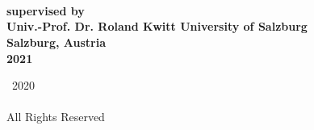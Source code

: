 

\thispagestyle{empty}

\begingroup
\centering
{}
~
\\[1em]
\sffamily\bfseries\fontsize{26}{31.2}\selectfont
\DocumentTitle
\\[0.4in]
\normalfont\large
\Large{\AuthorName}
\vspace{1cm}\\
\normalsize{supervised by}\\
\Large{Univ.-Prof. Dr. Roland Kwitt}
\vfill
University of Salzburg
\\[0.5em]
Salzburg, Austria
\\[1.5em]
2021
\par
\endgroup

\clearpage


\pagestyle{plain}
\setcounter{page}{2}

\begingroup
\centering
{}
\null
\vfill
{\sffamily\textcopyright}~2020
\\[0.5em]
\AuthorName
\\[0.5em]
All Rights Reserved
\par
\endgroup

\clearpage


